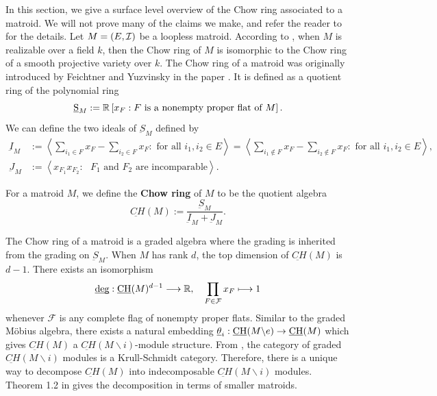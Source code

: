 \documentclass{puthesis-UG}
\begin{document}
In this section, we give a surface level overview of the Chow ring associated to a matroid. We will not prove many of the claims we make, and refer the reader to \cite{huh-semi-small} for the details. Let $M = (E, \mathcal{I})$ be a loopless matroid. According to \cite{huh-semi-small}, when $M$ is realizable over a field $k$, then the Chow ring of $M$ is isomorphic to the Chow ring of a smooth projective variety over $k$. The Chow ring of a matroid was originally introduced by Feichtner and Yuzvinsky in the paper \cite{Feichtner_2004}. It is defined as a quotient ring of the polynomial ring 
\[	
	\underbar{S}_M := \mathbb{R} \left [ x_F : F \text{ is a nonempty proper flat of } M \right ].
\]
We can define the two ideals of $\underbar{S}_M$ defined by 
\begin{align*}
	\underbar{I}_M & := \left \langle \sum_{i_1 \in F} x_F - \sum_{i_2 \in F} x_F : \text{ for all } i_1, i_2 \in E \right \rangle = \left \langle \sum_{i_1 \notin F} x_F - \sum_{i_2 \notin F} x_F : \text{ for all } i_1, i_2 \in E \right \rangle,  \\
	\underbar{J}_M & := \left \langle x_{F_1} x_{F_2} : \text{ $F_1$ and $F_2$ are incomparable}  \right \rangle.
\end{align*}

\begin{defn} \label{def:chow-ring-matroid}
	For a matroid $M$, we define the \textbf{Chow ring} of $M$ to be the quotient algebra 
	\[
		\underbar{CH} (M) := \frac{\underbar{S}_M}{\underbar{I}_M + \underbar{J}_M}. 
	\]
\end{defn}

The Chow ring of a matroid is a graded algebra where the grading is inherited from the grading on $\underbar{S}_M$. When $M$ has rank $d$, the top dimension of $\underbar{CH} (M)$ is $d-1$. There exists an isomorphism 
\[
	\underbar{deg} : \underbar{CH} (M)^{d-1} \longrightarrow \mathbb{R}, \quad \prod_{F \in \mathcal{F}} x_F \longmapsto 1
\]
whenever $\mathcal{F}$ is any complete flag of nonempty proper flats. Similar to the graded M\"obius algebra, there exists a natural embedding $\underbar{$\theta$}_i : \underbar{CH}(M \backslash e) \to \underbar{CH}(M)$ which gives $\underbar{CH}(M)$ a $\underbar{CH}(M \backslash i)$-module structure. From \cite{krull-schmidt}, the category of graded $\underbar{CH}(M \backslash i)$ modules is a Krull-Schmidt category. Therefore, there is a unique way to decompose $\underbar{CH}(M)$ into indecomposable $\underbar{CH}(M \backslash i)$ modules. Theorem 1.2 in \cite{huh-semi-small} gives the decomposition in terms of smaller matroids. 
\end{document}
